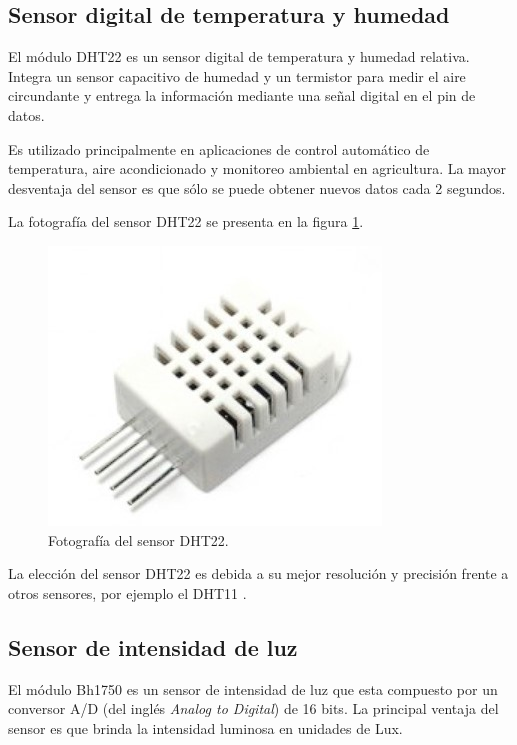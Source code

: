\subsection{Sensor digital de temperatura y humedad}

El módulo DHT22 \citep{WEBSITE:DHT22} es un sensor digital de temperatura y humedad relativa. Integra un sensor capacitivo de humedad y un termistor \citep{WEBSITE:TERMISTOR} para medir el aire circundante y entrega la información mediante una señal digital en el pin de datos. 

Es utilizado principalmente en aplicaciones de control automático de temperatura, aire acondicionado y monitoreo ambiental en agricultura. La mayor desventaja del sensor es que sólo se puede obtener nuevos datos cada 2 segundos. 

La fotografía del sensor DHT22 se presenta en la figura \ref{fig:fotografiaDHT22}.

\begin{figure}[H]
	\centering
	\includegraphics[width=.4\textwidth]{./Figures/DHT22.jpg}
	\caption{Fotografía del sensor DHT22\protect\footnotemark.}
	\label{fig:fotografiaDHT22}
\end{figure}


La elección del sensor DHT22 es debida a su mejor resolución y precisión frente a otros sensores, por ejemplo el DHT11 \citep{WEBSITE:DHT11}.


\subsection{Sensor de intensidad de luz}

El módulo Bh1750 \citep{WEBSITE:BH1750} es un sensor de intensidad de luz que esta compuesto por un conversor A/D (del inglés \textit{Analog to Digital}) \citep{WEBSITE:CONVERSORAD} de 16 bits. La principal ventaja del sensor es que brinda la intensidad luminosa en unidades de Lux.

